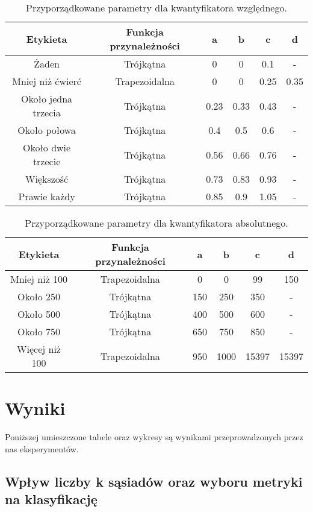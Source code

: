 \documentclass{classrep}
\begin{document}
\begin{table}[H]
	\centering
	\begin{tabular}{c c c c c c} 
		\hline
		\textbf{Etykieta} & \textbf{Funkcja przynależności} & \textbf{a} & \textbf{b} & \textbf{c} &  \textbf{d} \\ [0.5ex] 
		\hline
		\hline 
		Żaden & Trójkątna & 0 & 0 & 0.1 & - \\ 
		Mniej niż ćwierć & Trapezoidalna & 0 & 0 & 0.25 & 0.35 \\
		Około jedna trzecia & Trójkątna & 0.23 & 0.33 & 0.43 & - \\
		Około połowa & Trójkątna & 0.4 & 0.5 & 0.6 & - \\
		Około dwie trzecie & Trójkątna & 0.56 & 0.66 & 0.76 & - \\
		Większość & Trójkątna & 0.73 & 0.83 & 0.93 & - \\
		Prawie każdy & Trójkątna & 0.85 & 0.9 & 1.05 & - \\
		\hline
	\end{tabular}
	\caption{Przyporządkowane parametry dla kwantyfikatora względnego.}
\end{table}
\begin{table}[H]
	\centering
	\begin{tabular}{c c c c c c} 
		\hline
		\textbf{Etykieta} & \textbf{Funkcja przynależności} & \textbf{a} & \textbf{b} & \textbf{c} &  \textbf{d} \\ [0.5ex] 
		\hline
		\hline 
		Mniej niż 100 & Trapezoidalna & 0 & 0 & 99 & 150 \\ 
		Około 250 & Trójkątna & 150 & 250 & 350 & - \\
		Około 500 & Trójkątna & 400 & 500 & 600 & - \\
		Około 750 & Trójkątna & 650 & 750 & 850 & - \\
		Więcej niż 100 & Trapezoidalna & 950 & 1000 & 15397 & 15397 \\
		\hline
	\end{tabular}
	\caption{Przyporządkowane parametry dla kwantyfikatora absolutnego.}
\end{table}


\section{Wyniki}

Poniższej umieszczone tabele oraz wykresy są wynikami przeprowadzonych przez nas eksperymentów.

\subsection{Wpływ liczby k sąsiadów oraz wyboru metryki na klasyfikację}
\end{document}
